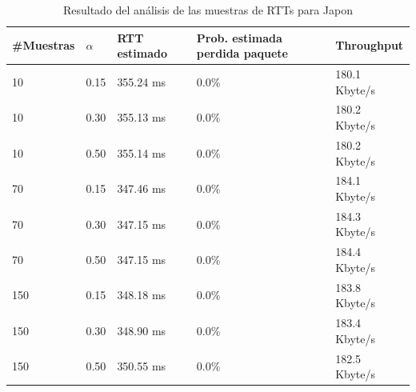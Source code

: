 \begin{table}[H]
	\centering
    \begin{tabular}{lllll}
    \hline
    \#Muestras & $\alpha$ & RTT estimado &Prob. estimada perdida paquete & Throughput \\	\hline
    10   &  0.15  &  355.24 ms  &  0.0\%  &  180.1 Kbyte/s  \\
    10   &  0.30  &  355.13 ms  &  0.0\%  &  180.2 Kbyte/s  \\
    10   &  0.50  &  355.14 ms  &  0.0\%  &  180.2 Kbyte/s  \\
    70   &  0.15  &  347.46 ms  &  0.0\%  &  184.1 Kbyte/s  \\
    70   &  0.30  &  347.15 ms  &  0.0\%  &  184.3 Kbyte/s  \\
    70   &  0.50  &  347.15 ms  &  0.0\%  &  184.4 Kbyte/s  \\
    150  &  0.15  &  348.18 ms  &  0.0\%  &  183.8 Kbyte/s  \\
    150  &  0.30  &  348.90 ms  &  0.0\%  &  183.4 Kbyte/s  \\
    150  &  0.50  &  350.55 ms  &  0.0\%  &  182.5 Kbyte/s  \\ \hline
    \end{tabular}
    \caption{Resultado del análisis de las muestras de RTTs para Japon}
  \label{fig:tabla-ertt-tokyo}
\end{table}
